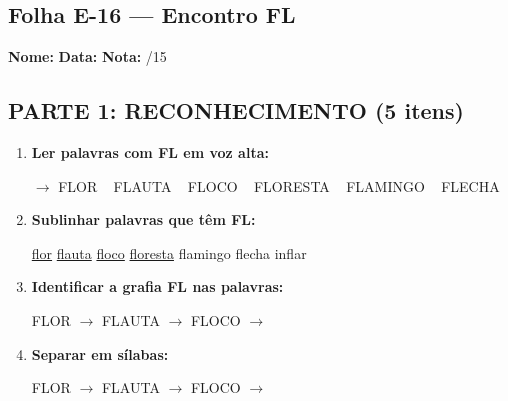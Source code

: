\subsection{Folha E-16 --- Encontro FL}
\begin{exercicio}



\noindent\textbf{Nome:} \underline{\hspace{3.2cm}} \quad \textbf{Data:} \underline{\hspace{1.6cm}} \quad \textbf{Nota:} \underline{\hspace{0.9cm}}/15


\subsection*{PARTE 1: RECONHECIMENTO (5 itens)}

\begin{enumerate}

  \item \textbf{Ler palavras com FL em voz alta:}
  \begin{center}
  $\rightarrow$ FLOR ~ FLAUTA ~ FLOCO ~ FLORESTA ~ FLAMINGO ~ FLECHA
  \end{center}

  \item \textbf{Sublinhar palavras que têm FL:}

\begin{center}
  \uline{flor} \quad \uline{flauta} \quad \uline{floco} \quad \uline{floresta} \quad flamingo \quad flecha \quad inflar
\end{center}

  \item \textbf{Identificar a grafia FL nas palavras:}
  \begin{center}
  FLOR $\rightarrow$ \underline{\hspace{1cm}} \quad FLAUTA $\rightarrow$ \underline{\hspace{1cm}} \quad FLOCO $\rightarrow$ \underline{\hspace{1cm}}
  \end{center}

  \item \textbf{Separar em sílabas:}
  \begin{center}
  FLOR $\rightarrow$ \underline{\hspace{1.2cm}} \quad FLAUTA $\rightarrow$ \underline{\hspace{1.2cm}} \quad FLOCO $\rightarrow$ \underline{\hspace{1.2cm}}
  \end{center}


\end{enumerate}
\end{exercicio}
